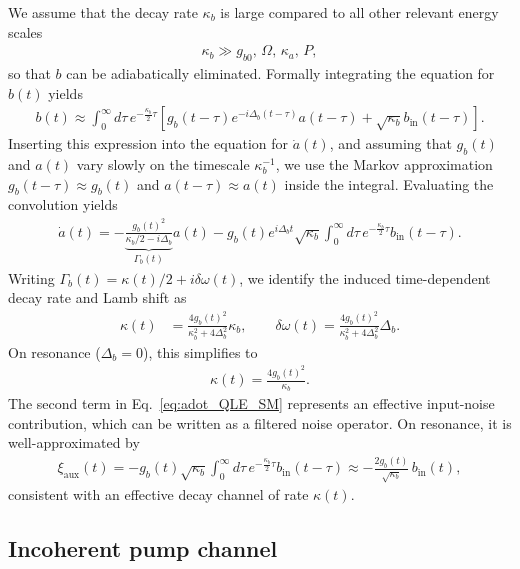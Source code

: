 \documentclass[prl,twocolumn,floatfix,10pt,superscriptaddress]{revtex4-2}
\begin{document}
We assume that the decay rate $\kappa_b$ is large compared to all other relevant energy scales
\begin{align}
\kappa_b \gg g_{b0},\, \Omega,\, \kappa_a,\, P,
\end{align}
so that $b$ can be adiabatically eliminated. Formally integrating the equation for $b(t)$ yields
\begin{align}
b(t) \approx \int_0^\infty d\tau\, e^{-\frac{\kappa_b}{2} \tau}
\left[ g_b(t - \tau) e^{-i \Delta_b (t - \tau)} a(t - \tau)
+ \sqrt{\kappa_b} b_{\text{in}}(t - \tau) \right].
\end{align}
Inserting this expression into the equation for $\dot{a}(t)$, and assuming that $g_b(t)$ and $a(t)$ vary slowly on the timescale $\kappa_b^{-1}$, we use the Markov approximation
$g_b(t - \tau) \approx g_b(t)$ and $a(t - \tau) \approx a(t)$ inside the integral. Evaluating the convolution yields
\begin{align}
\dot{a}(t)
= -\underbrace{\frac{g_b(t)^2}{\kappa_b/2 - i \Delta_b}}_{\Gamma_b(t)} a(t)
- g_b(t) e^{i \Delta_b t} \sqrt{\kappa_b} \int_0^\infty d\tau\, e^{-\frac{\kappa_b}{2} \tau} b_{\text{in}}(t - \tau).
\label{eq:adot_QLE_SM}
\end{align}
Writing $\Gamma_b(t) = \kappa(t)/2 + i\delta\omega(t)$, we identify the induced time-dependent decay rate and Lamb shift as
\begin{align}
\kappa(t) &= \frac{4 g_b(t)^2}{\kappa_b^2 + 4 \Delta_b^2}\kappa_b,\qquad
\delta\omega(t) = \frac{4 g_b(t)^2}{\kappa_b^2 + 4 \Delta_b^2}\Delta_b.
\end{align}
On resonance ($\Delta_b = 0$), this simplifies to
\begin{align}
\kappa(t) = \frac{4 g_b(t)^2}{\kappa_b}.
\end{align}
The second term in Eq.~\eqref{eq:adot_QLE_SM} represents an effective input-noise contribution, which can be written as a filtered noise operator. On resonance, it is well-approximated by
\begin{align}
\xi_{\text{aux}}(t)
= - g_b(t) \sqrt{\kappa_b} \int_0^\infty d\tau\, e^{-\frac{\kappa_b}{2} \tau} b_{\text{in}}(t - \tau)
\approx - \frac{2 g_b(t)}{\sqrt{\kappa_b}}\, b_{\text{in}}(t),
\end{align}
consistent with an effective decay channel of rate $\kappa(t)$.

\subsection{Incoherent pump channel}
\end{document}
